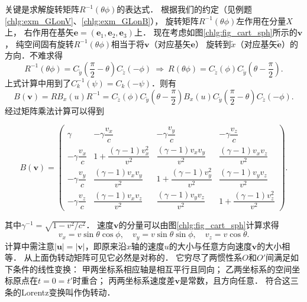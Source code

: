关键是求解旋转矩阵$R^{-1}({\theta \phi })$的表达式．
根据我们的约定（见例题\ref{chlg:exm_GLonV}、\ref{chlg:exm_GLonB}），
旋转矩阵$R^{-1}({\theta \phi })$左作用在分量$X$上，
右作用在基矢$\boldsymbol{e}=(\boldsymbol{e}_1,\boldsymbol{e}_2,\boldsymbol{e}_3)$上．
现在考虑如图\ref{chlg:fig_cart_sph}所示的$\boldsymbol{v}$，
纯空间固有旋转$R^{-1}({\theta \phi })$相当于将$\boldsymbol{v}$（对应基矢$\boldsymbol{e}$）
旋转到$\tilde{x}$（对应基矢$\tilde{\boldsymbol{e}}$）的方向．不难求得
\begin{equation}\label{chlg:eqn_R-of-bx2b}
    R^{-1}( {\theta \phi } )  = C_{\tilde y}\left({\frac{\pi }{2} -\theta} \right) C_{\tilde z}( -\phi )
    \ \Rightarrow\  R( {\theta \phi } )  =
    {C_{\tilde  z}}(  {\phi } ) {C_{\tilde  y}} \left(  { \theta -\frac{\pi }{2}} \right) .
\end{equation}
上式计算中用到了$C_k^{-1}(\psi)=C_k(-\psi)$．则有
\begin{equation*}
    B\left( \boldsymbol{v} \right) = R{B_x}(u)R^{-1}={C_{\tilde z}}\left(  {\phi } \right)
    {C_{\tilde y}} \left(  { \theta -\frac{\pi }{2}} \right) {B_x} \left( u \right)
    {C_{\tilde y}}\left( {\frac{\pi }{2}-\theta} \right){C_{\tilde z}}\left( -\phi \right) .
\end{equation*}
经过矩阵乘法计算可以得到
\begin{small}
\begin{equation}\label{chlg:eqn_lorentz-matrix-any-v}
    B(\boldsymbol{v}) = \begin{pmatrix}
        \gamma    & -\gamma \dfrac{v_x}{c} & -\gamma \dfrac{v_y}{c} & -\gamma \dfrac{v_z}{c} \\
        -\gamma \dfrac{v_x}{c} & 1+ \dfrac{(\gamma-1)v_x^2}{v^2} &
        \dfrac{(\gamma-1)v_x v_y}{v^2} & \dfrac{(\gamma-1)v_x v_z}{v^2} \\
        -\gamma \dfrac{v_y}{c} & \dfrac{(\gamma-1)v_x v_y}{v^2} &
        1+ \dfrac{(\gamma-1)v_y^2}{v^2} & \dfrac{(\gamma-1)v_y v_z}{v^2} \\
        -\gamma \dfrac{v_z}{c} & \dfrac{(\gamma-1)v_x v_z}{v^2} &
        \dfrac{(\gamma-1)v_y v_z}{v^2} & 1+ \dfrac{(\gamma-1)v_z^2}{v^2}
    \end{pmatrix}.
\end{equation}
\end{small}
其中$\gamma^{-1}=\sqrt{1-v^2/c^2}$．
速度$\boldsymbol{v}$的分量可以由图\ref{chlg:fig_cart_sph}计算求得
\begin{equation}
    {v_x} = v\sin \theta \cos \phi, \quad
    {v_y} = v\sin \theta \sin \phi, \quad
    {v_z} = v\cos \theta  .
\end{equation}
计算中需注意$|\boldsymbol{u}|=|\boldsymbol{v}|$，即原来沿$x$轴的速度$u$的大小与任意方向速度$\boldsymbol{v}$的大小相等．
从上面伪转动矩阵可见它必然是对称的．
它穷尽了两惯性系$O$和$O'$间满足如下条件的线性变换：
\textcircled{\tiny{甲}}两坐标系相应轴是相互平行且同向；
\textcircled{\tiny{乙}}两坐标系的空间坐标原点在$t=0=t'$时重合；
\textcircled{\tiny{丙}}两坐标系速度差$\boldsymbol{v}$是常数，且方向任意．
符合这三条的Lorentz变换叫作{\heiti 伪转动}．

